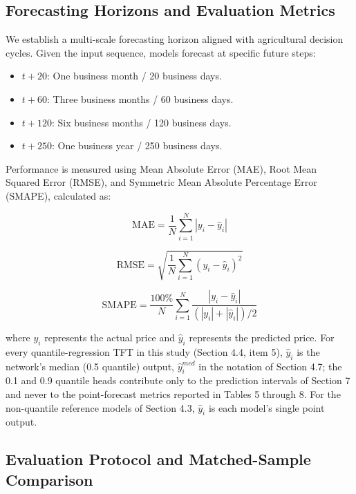 \documentclass[review,3p,times]{elsarticle}
\begin{document}
\subsection{Forecasting Horizons and Evaluation Metrics}
We establish a multi-scale forecasting horizon aligned with agricultural decision cycles. Given the input sequence, models forecast at specific future steps:
\begin{itemize}
\item $t+20$: One business month / 20 business days.
\item $t+60$: Three business months / 60 business days.
\item $t+120$: Six business months / 120 business days.
\item $t+250$: One business year / 250 business days.

\end{itemize}
Performance is measured using Mean Absolute Error (MAE), Root Mean Squared Error (RMSE), and Symmetric Mean Absolute Percentage Error (SMAPE), calculated as:

\[\text{MAE} = \frac{1}{N} \sum_{i=1}^{N} |y_i - \hat{y}_i|\]

\[\text{RMSE} = \sqrt{\frac{1}{N} \sum_{i=1}^{N} (y_i - \hat{y}_i)^2}\]

\[\text{SMAPE} = \frac{100\%}{N} \sum_{i=1}^{N} \frac{|y_i - \hat{y}_i|}{(|y_i| + |\hat{y}_i|)/2}\]

where $y_i$ represents the actual price and $\hat{y}_i$ represents the predicted price. For every quantile-regression TFT in this study (Section 4.4, item 5), $\hat{y}_i$ is the network's median (0.5 quantile) output, $\hat{y}^{med}_i$ in the notation of Section 4.7; the 0.1 and 0.9 quantile heads contribute only to the prediction intervals of Section 7 and never to the point-forecast metrics reported in Tables 5 through 8. For the non-quantile reference models of Section 4.3, $\hat{y}_i$ is each model's single point output.

\subsection{Evaluation Protocol and Matched-Sample Comparison}
\end{document}
